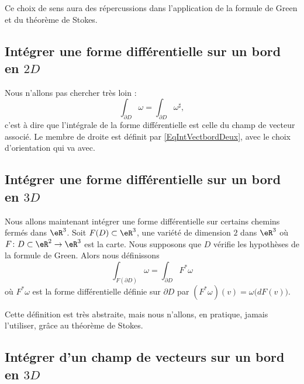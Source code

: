 Ce choix de sens aura des répercussions dans l'application de la formule de Green et du théorème de Stokes.

\subsection{Intégrer une forme différentielle sur un bord en $2D$}

Nous n'allons pas chercher très loin :
\begin{equation}
	\int_{\partial D}\omega=\int_{\partial D}\omega^{\sharp},
\end{equation}
c'est à dire que l'intégrale de la forme différentielle est celle du champ de vecteur associé. Le membre de droite est définit par \eqref{EqIntVectbordDeux}, avec le choix d'orientation qui va avec.

\subsection{Intégrer une forme différentielle sur un bord en $3D$}

Nous allons maintenant intégrer une forme différentielle sur certains chemins fermés dans $\eR^3$. Soit $F(D)\subset\eR^3$, une variété de dimension $2$ dans $\eR^3$ où $F\colon D\subset\eR^2\to \eR^3$ est la carte. Nous supposons que $D$ vérifie les hypothèses de la formule de Green. Alors nous définissons
\begin{equation}		\label{EqDefIntTroisForBord}
	\int_{F(\partial D)}\omega = \int_{\partial D} F^*\omega
\end{equation}
où $F^*\omega$ est la forme différentielle définie sur $\partial D$ par $(F^*\omega)(v)=\omega\big( dF(v) \big)$.

Cette définition est très abstraite, mais nous n'allons, en pratique, jamais l'utiliser, grâce au théorème de Stokes.

\subsection{Intégrer d'un champ de vecteurs sur un bord en $3D$}

